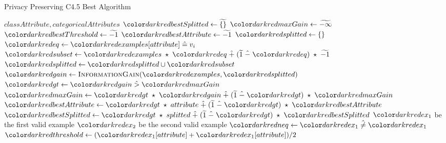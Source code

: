 \begin{algorithm}[H]
\caption{Privacy Preserving C4.5 Best Algorithm}\label{a:c45-best-pp}
\begin{algorithmic}[1]
\renewcommand{\algorithmicrequire}{\textbf{Global Vars:}}
\Require $classAttribute, categoricalAttributes$
  \State $\red{bestSplitted} \gets \enc{\{\}}$
  \State $\red{maxGain} \gets \enc{-\infty}$
  \State $\red{bestThreshold} \gets \enc{-1}$
  \State $\red{bestAttribute} \gets \enc{-1}$
      \State $\red{splitted} \gets \{\}$
        \State $\red{eq} \gets \red{examples}[attribute] \heq v_i$ 
        \State $\red{subset} \gets \red{examples} \hmul \red{eq} \hplus (\enc{1} \hminus \red{eq}) \hmul \enc{-1} $ 
          \State $\red{splitted} \gets \red{splitted} \cup \red{subset}$
        \EndFor
        \State $\red{gain} \gets  \textsc{InformationGain}(\red{examples}, \red{splitted})$
        \State $\red{gt} \gets \red{gain} \hgt  \red{maxGain}$
        \State $\red{maxGain} \gets \red{gt} \hmul \red{gain} \hplus (\enc{1} \hminus \red{gt}) \hmul \red{maxGain}$ 
        \State $\red{bestAttribute} \gets \red{gt} \hmul attribute \hplus (\enc{1} \hminus \red{gt}) \hmul \red{bestAttribute}$
        \State $\red{bestSplitted} \gets \red{gt} \hmul splitted \hplus (\enc{1} \hminus \red{gt}) \hmul \red{bestSplitted}$
    \Else {}
           $\red{ex_1}$ {\small be the first valid example}
           $\red{ex_2}$ {\small be the second valid example}
          \State $\red{neq} \gets \red{ex_1} \hneq \red{ex_1}$
          \State $\red{threshold} \gets (\red{ex_1}[attribute] + \red{ex_1}[attribute]) / 2$

\end{algorithmic}
\end{algorithm}
